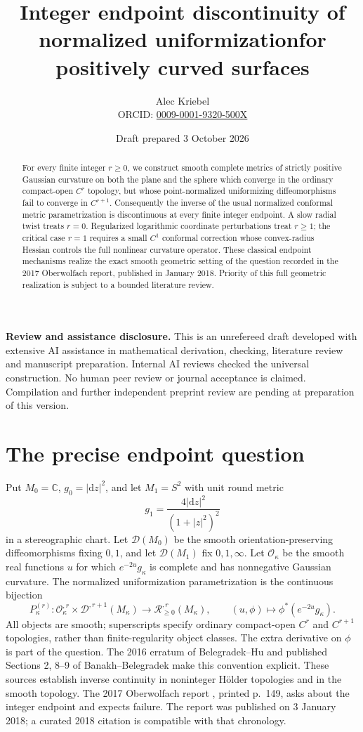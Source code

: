 \documentclass[11pt]{article}
\title{Integer endpoint discontinuity of normalized uniformization\newline for positively curved surfaces}
\author{Alec Kriebel\\\small ORCID: \href{https://orcid.org/0009-0001-9320-500X}{0009-0001-9320-500X}}
\date{Draft prepared 3 October 2026}
\newcommand{\C}{\mathbb C}
\newcommand{\dd}{\mathrm d}
\begin{document}
\maketitle
\begin{abstract}
For every finite integer $r\geq0$, we construct smooth complete metrics of strictly positive Gaussian curvature on both the plane and the sphere which converge in the ordinary compact-open $C^r$ topology, but whose point-normalized uniformizing diffeomorphisms fail to converge in $C^{r+1}$. Consequently the inverse of the usual normalized conformal metric parametrization is discontinuous at every finite integer endpoint. A slow radial twist treats $r=0$. Regularized logarithmic coordinate perturbations treat $r\geq1$; the critical case $r=1$ requires a small $C^1$ conformal correction whose convex-radius Hessian controls the full nonlinear curvature operator. These classical endpoint mechanisms realize the exact smooth geometric setting of the question recorded in the 2017 Oberwolfach report, published in January 2018. Priority of this full geometric realization is subject to a bounded literature review.
\end{abstract}

\noindent\textbf{Review and assistance disclosure.} This is an unrefereed draft developed with extensive AI assistance in mathematical derivation, checking, literature review and manuscript preparation. Internal AI reviews checked the universal construction. No human peer review or journal acceptance is claimed. Compilation and further independent preprint review are pending at preparation of this version.

\section{The precise endpoint question}
Put $M_0=\C$, $g_0=|\dd z|^2$, and let $M_1=S^2$ with unit round metric
\[
 g_1=\frac{4|\dd z|^2}{(1+|z|^2)^2}
\]
in a stereographic chart. Let $\mathcal D(M_0)$ be the smooth orientation-preserving diffeomorphisms fixing $0,1$, and let $\mathcal D(M_1)$ fix $0,1,\infty$. Let $\mathcal O_\kappa$ be the smooth real functions $u$ for which $e^{-2u}g_\kappa$ is complete and has nonnegative Gaussian curvature. The normalized uniformization parametrization is the continuous bijection
\begin{equation}\label{eq:parameter}
 P_\kappa^{(r)}:\mathcal O_\kappa^{,r}\times\mathcal D^{,r+1}(M_\kappa)
 \longrightarrow \mathcal R_{\geq0}^{,r}(M_\kappa),\qquad
 (u,\phi)\longmapsto \phi^*(e^{-2u}g_\kappa).
\end{equation}
All objects are smooth; superscripts specify ordinary compact-open $C^r$ and $C^{r+1}$ topologies, rather than finite-regularity object classes. The extra derivative on $\phi$ is part of the question. The 2016 erratum of Belegradek--Hu \cite{BH16} and published Sections 2, 8--9 of Banakh--Belegradek \cite{BB18} make this convention explicit. These sources establish inverse continuity in noninteger H\"older topologies and in the smooth topology. The 2017 Oberwolfach report \cite{OWR}, printed p.~149, asks about the integer endpoint and expects failure. The report was published on 3 January 2018; a curated 2018 citation is compatible with that chronology.
\end{document}
